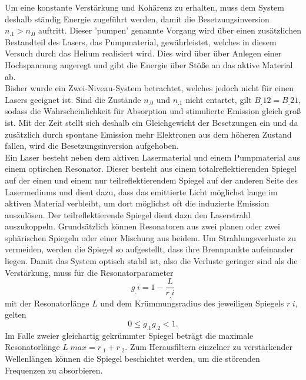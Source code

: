 Um eine konstante Verstärkung und Kohärenz zu erhalten, muss dem System deshalb ständig Energie zugeführt werden, damit die Besetzungsinversion $n_.1>n_.0$ auftritt. Dieser 'pumpen' genannte Vorgang wird über einen zusätzlichen Bestandteil des Lasers, das Pumpmaterial, gewährleistet, welches in diesem Versuch durch das Helium realisiert wird. Dies wird über über Anlegen einer Hochspannung angeregt und gibt die Energie über Stöße an das aktive Material ab.\\
Bisher wurde ein Zwei-Niveau-System betrachtet, welches jedoch nicht für einen Lasers geeignet ist. Sind die Zustände $n_.0$ und $n_.1$ nicht entartet, gilt $B_.{12}=B_.{21}$, sodass die Wahrscheinlichkeit für Absorption und stimulierte Emission gleich groß ist. Mit der Zeit stellt sich deshalb ein Gleichgewicht der Besetzungen ein und da zusätzlich durch spontane Emission mehr Elektronen aus dem höheren Zustand fallen, wird die Besetzungsinversion aufgehoben.\\ 
Ein Laser besteht neben dem aktiven Lasermaterial und einem Pumpmaterial aus einem optischen Resonator.
Dieser besteht aus einem totalreflektierenden Spiegel auf der einen und einem nur teilreflektierendem Spiegel auf der anderen Seite des Lasermediums und dient dazu, dass das emittierte Licht möglichst lange im aktiven Material verbleibt, um dort möglichst oft die induzierte Emission auszulösen. Der teilreflektierende Spiegel dient dazu den Laserstrahl auszukoppeln. Grundsätzlich können Resonatoren aus zwei planen oder zwei sphärischen Spiegeln oder einer Mischung aus beidem. Um Strahlungsverluste zu vermeiden, werden die Spiegel so aufgestellt, dass ihre Brennpunkte aufeinander liegen. Damit das System optisch stabil ist, also die Verluste geringer sind als die Verstärkung, muss für die Resonatorparameter
\[
g_.i = 1 - \frac{L}{r_.i}
\]
mit der Resonatorlänge $L$ und dem Krümmungsradius des jeweiligen Spiegels $r_.i$, gelten
\begin{equation}
0 \leq g_.1g_.2 < 1\text{.}\label{eq:stabil}
\end{equation}
Im Falle zweier gleichartig gekrümmter Spiegel beträgt die maximale Resonatorlänge $L_.{max}=r_.1+r_.2$.
Zum Herausfiltern einzelner zu verstärkender Wellenlängen können die Spiegel beschichtet werden, um die störenden Frequenzen zu absorbieren.

